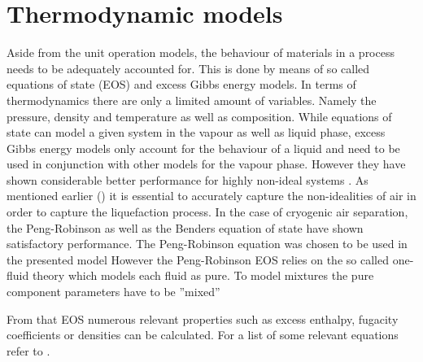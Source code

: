 \section{Thermodynamic models}
\label{sec:peng-rob}
    Aside from the unit operation models, the behaviour of materials in a process needs to be adequately
    accounted for. This is done by means of so called equations of state (EOS) and excess Gibbs energy
    models. In terms of thermodynamics there are only a limited amount of variables. Namely the pressure,
    density and temperature as well as composition. While equations of state can model a given system in
    the vapour as well as liquid phase, excess Gibbs energy models only account for the behaviour of a liquid
    and need to be used in conjunction with other models for the vapour phase. However they have shown
    considerable better performance for highly non-ideal systems \cite{AndreasPfennig.2003}. As mentioned
    earlier () it is essential to accurately capture the non-idealities of air
    in order to capture the liquefaction process. In the case of cryogenic air separation, the Peng-Robinson
    as well as the Benders equation of state have shown satisfactory performance. The Peng-Robinson equation
    was chosen to be used in the presented model
    However the Peng-Robinson EOS relies on the so called one-fluid theory which models each fluid as pure.
    To model mixtures the pure component parameters have to be ''mixed''

    From that EOS numerous relevant properties such as excess enthalpy, fugacity coefficients or densities
    can be calculated. For a list of some relevant equations refer to .
	
